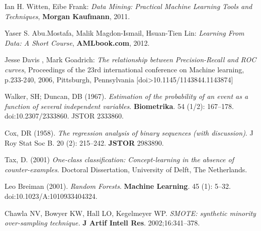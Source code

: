 \begin{thebibliography}{9}
Ian H. Witten, Eibe Frank: \textit{Data Mining: Practical Machine Learning Tools and Techniques}, \textbf{Morgan Kaufmann}, 2011.

Yaser S. Abu.Mostafa, Malik Magdon-Ismail, Hsuan-Tien Lin: \textit{Learning From Data: A Short Course}, \textbf{AMLbook.com}, 2012.

Jesse Davis , Mark Goadrich: \textit{The relationship between Precision-Recall and ROC curves}, Proceedings of the 23rd international conference on Machine learning, p.233-240, 2006, Pittsburgh, Pennsylvania  [doi>10.1145/1143844.1143874] 

Walker, SH; Duncan, DB (1967). \textit{Estimation of the probability of an event as a function of several independent variables}. \textbf{Biometrika}. 54 (1/2): 167–178. doi:10.2307/2333860. JSTOR 2333860.

Cox, DR (1958). \textit{The regression analysis of binary sequences (with discussion)}. J Roy Stat Soc B. 20 (2): 215–242. \textbf{JSTOR} 2983890. 

Tax, D. (2001) \textit{One-class classification: Concept-learning in the absence of counter-examples}. Doctoral Dissertation, University of Delft, The Netherlands. 

Leo Breiman (2001). \textit{Random Forests}. \textbf{Machine Learning}. 45 (1): 5–32. doi:10.1023/A:1010933404324. 

Chawla NV, Bowyer KW, Hall LO, Kegelmeyer WP. \textit{SMOTE: synthetic minority over-sampling technique.} \textbf{J Artif Intell Res}. 2002;16:341–378.

\end{thebibliography}